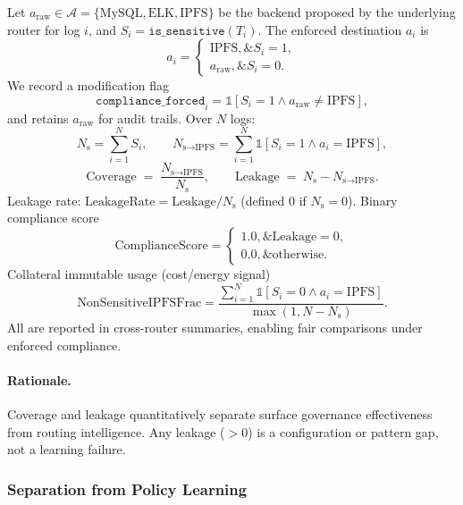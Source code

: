Let $a_{\text{raw}} \in \mathcal{A} = \{\text{MySQL}, \text{ELK}, \text{IPFS}\}$ be the backend proposed by the underlying router for log $i$, and $S_i = \texttt{is\_sensitive}(T_i)$. The enforced destination $a_i$ is
\[
a_i =
\begin{cases}
\text{IPFS},\& S_i = 1,\\
a_{\text{raw}},\& S_i = 0.
\end{cases}
\]
We record a modification flag
\[
\texttt{compliance\_forced}_i = \mathbb{1}[S_i = 1 \land a_{\text{raw}} \neq \text{IPFS}],
\]
and retains $a_{\text{raw}}$ for audit trails. Over $N$ logs:
\[
N_{\text{s}} = \sum_{i=1}^{N} S_i,\qquad
N_{\text{s}\rightarrow \text{IPFS}} = \sum_{i=1}^{N} \mathbb{1}[S_i = 1 \land a_i = \text{IPFS}],
\]
\[
\text{Coverage} \;=\; \frac{N_{\text{s}\rightarrow \text{IPFS}}}{N_{\text{s}}}, \qquad
\text{Leakage} \;=\; N_{\text{s}} - N_{\text{s}\rightarrow \text{IPFS}}.
\]
Leakage rate: $\text{LeakageRate} = \text{Leakage}/N_{\text{s}}$ (defined $0$ if $N_{\text{s}}=0$). Binary compliance score
\[
\text{ComplianceScore} =
\begin{cases}
1.0,\& \text{Leakage}=0,\\
0.0,\& \text{otherwise}.
\end{cases}
\]
Collateral immutable usage (cost/energy signal)
\[
\text{NonSensitiveIPFSFrac} = \frac{\sum_{i=1}^{N} \mathbb{1}[S_i = 0 \land a_i = \text{IPFS}]}{\max(1, N - N_{\text{s}})}.
\]
All are reported in cross-router summaries, enabling fair comparisons under enforced compliance.

\paragraph{Rationale.}
Coverage and leakage quantitatively separate surface governance effectiveness from routing intelligence. Any leakage ($>0$) is a configuration or pattern gap, not a learning failure.

\subsubsection{Separation from Policy Learning}\label{s:compliance-separation}

